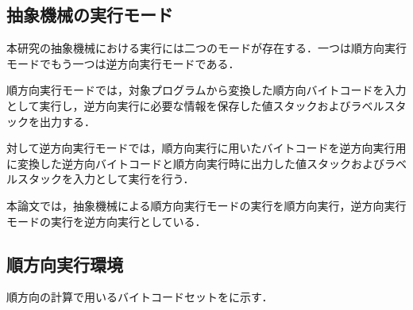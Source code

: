 \documentclass[submit,PRO]{ipsj}
\begin{document}
\subsection{抽象機械の実行モード}
本研究の抽象機械における実行には二つのモードが存在する．一つは順方向実行モードでもう一つは逆方向実行モードである．

順方向実行モードでは，対象プログラムから変換した順方向バイトコードを入力として実行し，逆方向実行に必要な情報を保存した値スタックおよびラベルスタックを出力する．

対して逆方向実行モードでは，順方向実行に用いたバイトコードを逆方向実行用に変換した逆方向バイトコードと順方向実行時に出力した値スタックおよびラベルスタックを入力として実行を行う．

本論文では，抽象機械による順方向実行モードの実行を順方向実行，逆方向実行モードの実行を逆方向実行としている．

\subsection{順方向実行環境}

順方向の計算で用いるバイトコードセットをに示す．
\end{document}
